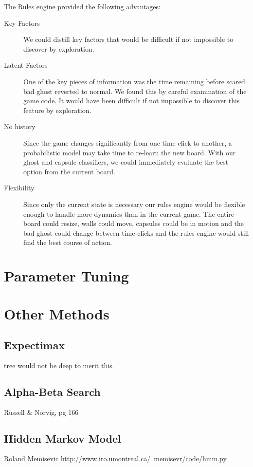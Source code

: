\documentclass[11pt, oneside]{article}   	%
\begin{document}
The Rules engine provided the following advantages:
\begin{description}
	\item[Key Factors]We could distill key factors that would be difficult if not impossible to discover by exploration.
	\item[Latent Factors]One of the key pieces of information was the time remaining before scared bad ghost reverted to normal. We found this by careful examination of the game code. It would have been difficult if not impossible to discover this feature by exploration.
	\item[No history]Since the game changes significantly from one time click to another, a probabilistic model may take time to re-learn the new board. With our ghost and capsule classifiers, we could immediately evaluate the best option from the current board.
	\item[Flexibility]Since only the current state is necessary our rules engine would be flexible enough to handle more dynamics than in the current game. The entire board could resize,  walls could move, capsules could be in motion and the bad ghost could change between time clicks and the rules engine would still find the best course of action.
\end{description}

\section*{Parameter Tuning}

\section*{Other Methods}
\subsection*{Expectimax}
tree would not be deep to merit this. 

\subsection*{Alpha-Beta Search}
Russell \& Norvig, pg 166

\subsection*{Hidden Markov Model}
 Roland Memisevic
 http://www.iro.umontreal.ca/~memisevr/code/hmm.py
\end{document}
